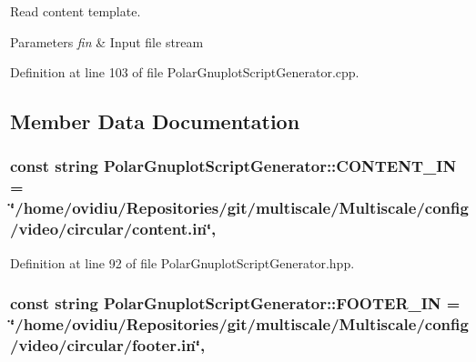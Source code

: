 Read content template. 


\begin{DoxyParams}{Parameters}
{\em fin} & Input file stream \\
\hline
\end{DoxyParams}


Definition at line 103 of file Polar\-Gnuplot\-Script\-Generator.\-cpp.



\subsection{Member Data Documentation}
\hypertarget{classmultiscale_1_1video_1_1PolarGnuplotScriptGenerator_ad8fb67fe439899d85924bd7339b7d08c}{
\subsubsection[{C\-O\-N\-T\-E\-N\-T\-\_\-\-I\-N}]{\setlength{\rightskip}{0pt plus 5cm}const string Polar\-Gnuplot\-Script\-Generator\-::\-C\-O\-N\-T\-E\-N\-T\-\_\-\-I\-N = \char`\"{}/home/ovidiu/Repositories/git/multiscale/Multiscale/config/video/circular/content.\-in\char`\"{}\hspace{0.3cm}{\ttfamily [static]}, {\ttfamily [private]}}}\label{classmultiscale_1_1video_1_1PolarGnuplotScriptGenerator_ad8fb67fe439899d85924bd7339b7d08c}


Definition at line 92 of file Polar\-Gnuplot\-Script\-Generator.\-hpp.

\hypertarget{classmultiscale_1_1video_1_1PolarGnuplotScriptGenerator_aae225d7380fd7815efa1aed69087e6b0}{
\subsubsection[{F\-O\-O\-T\-E\-R\-\_\-\-I\-N}]{\setlength{\rightskip}{0pt plus 5cm}const string Polar\-Gnuplot\-Script\-Generator\-::\-F\-O\-O\-T\-E\-R\-\_\-\-I\-N = \char`\"{}/home/ovidiu/Repositories/git/multiscale/Multiscale/config/video/circular/footer.\-in\char`\"{}\hspace{0.3cm}{\ttfamily [static]}, {\ttfamily [private]}}}\label{classmultiscale_1_1video_1_1PolarGnuplotScriptGenerator_aae225d7380fd7815efa1aed69087e6b0}


